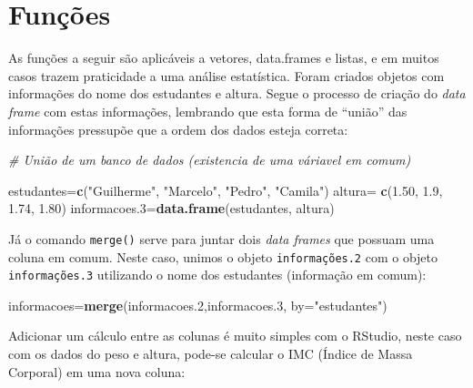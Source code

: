 \documentclass[12pt,brazil,]{book}
\newenvironment{Shaded}{\begin{snugshade}}{\end{snugshade}}
\newcommand{\CommentTok}[1]{\textcolor[rgb]{0.56,0.35,0.01}{\textit{#1}}}
\newcommand{\DataTypeTok}[1]{\textcolor[rgb]{0.13,0.29,0.53}{#1}}
\newcommand{\DecValTok}[1]{\textcolor[rgb]{0.00,0.00,0.81}{#1}}
\newcommand{\FloatTok}[1]{\textcolor[rgb]{0.00,0.00,0.81}{#1}}
\newcommand{\KeywordTok}[1]{\textcolor[rgb]{0.13,0.29,0.53}{\textbf{#1}}}
\newcommand{\NormalTok}[1]{#1}
\newcommand{\OperatorTok}[1]{\textcolor[rgb]{0.81,0.36,0.00}{\textbf{#1}}}
\newcommand{\StringTok}[1]{\textcolor[rgb]{0.31,0.60,0.02}{#1}}
\begin{document}
\hypertarget{funcoes}{%
\section{Funções}\label{funcoes}}

As funções a seguir são aplicáveis a vetores, data.frames e listas, e em
muitos casos trazem praticidade a uma análise estatística. Foram criados
objetos com informações do nome dos estudantes e altura. Segue o
processo de criação do \emph{data frame} com estas informações,
lembrando que esta forma de ``união'' das informações pressupõe que a
ordem dos dados esteja correta:

\begin{Shaded}
\begin{Highlighting}[]
\CommentTok{# União de um banco de dados (existencia de uma váriavel em comum)}

\NormalTok{estudantes=}\KeywordTok{c}\NormalTok{(}\StringTok{"Guilherme"}\NormalTok{, }\StringTok{"Marcelo"}\NormalTok{, }\StringTok{"Pedro"}\NormalTok{, }\StringTok{"Camila"}\NormalTok{)}
\NormalTok{altura=}\StringTok{ }\KeywordTok{c}\NormalTok{(}\FloatTok{1.50}\NormalTok{, }\FloatTok{1.9}\NormalTok{, }\FloatTok{1.74}\NormalTok{, }\FloatTok{1.80}\NormalTok{)}
\NormalTok{informacoes}\FloatTok{.3}\NormalTok{=}\KeywordTok{data.frame}\NormalTok{(estudantes, altura)}
\end{Highlighting}
\end{Shaded}

Já o comando \texttt{merge()} serve para juntar dois \emph{data frames}
que possuam uma coluna em comum. Neste caso, unimos o objeto
\texttt{informações.2} com o objeto \texttt{informações.3} utilizando o
nome dos estudantes (informação em comum):

\begin{Shaded}
\begin{Highlighting}[]
\NormalTok{informacoes=}\KeywordTok{merge}\NormalTok{(informacoes}\FloatTok{.2}\NormalTok{,informacoes}\FloatTok{.3}\NormalTok{, }\DataTypeTok{by=}\StringTok{"estudantes"}\NormalTok{)}
\end{Highlighting}
\end{Shaded}

Adicionar um cálculo entre as colunas é muito simples com o RStudio,
neste caso com os dados do peso e altura, pode-se calcular o IMC (Índice
de Massa Corporal) em uma nova coluna:

\begin{Shaded}
\end{Shaded}
\end{document}
